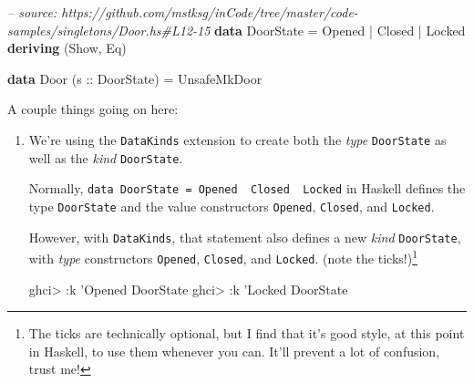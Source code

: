 \documentclass[]{article}
\newenvironment{Shaded}{}{}
\newcommand{\KeywordTok}[1]{\textcolor[rgb]{0.00,0.44,0.13}{\textbf{#1}}}
\newcommand{\DataTypeTok}[1]{\textcolor[rgb]{0.56,0.13,0.00}{#1}}
\newcommand{\CharTok}[1]{\textcolor[rgb]{0.25,0.44,0.63}{#1}}
\newcommand{\CommentTok}[1]{\textcolor[rgb]{0.38,0.63,0.69}{\textit{#1}}}
\newcommand{\OtherTok}[1]{\textcolor[rgb]{0.00,0.44,0.13}{#1}}
\newcommand{\FunctionTok}[1]{\textcolor[rgb]{0.02,0.16,0.49}{#1}}
\newcommand{\NormalTok}[1]{#1}
\begin{document}
\begin{Shaded}
\begin{Highlighting}[]
\CommentTok{-- source: https://github.com/mstksg/inCode/tree/master/code-samples/singletons/Door.hs#L12-15}
\KeywordTok{data} \DataTypeTok{DoorState} \FunctionTok{=} \DataTypeTok{Opened} \FunctionTok{|} \DataTypeTok{Closed} \FunctionTok{|} \DataTypeTok{Locked}
  \KeywordTok{deriving}\NormalTok{ (}\DataTypeTok{Show}\NormalTok{, }\DataTypeTok{Eq}\NormalTok{)}

\KeywordTok{data} \DataTypeTok{Door}\NormalTok{ (}\OtherTok{s ::} \DataTypeTok{DoorState}\NormalTok{) }\FunctionTok{=} \DataTypeTok{UnsafeMkDoor}
\end{Highlighting}
\end{Shaded}

A couple things going on here:

\begin{enumerate}
\def\labelenumi{\arabic{enumi}.}
\item
  We're using the \texttt{DataKinds} extension to create both the \emph{type}
  \texttt{DoorState} as well as the \emph{kind} \texttt{DoorState}.

  Normally,
  \texttt{data\ DoorState\ =\ Opened\ \textbar{}\ Closed\ \textbar{}\ Locked} in
  Haskell defines the type \texttt{DoorState} and the value constructors
  \texttt{Opened}, \texttt{Closed}, and \texttt{Locked}.

  However, with \texttt{DataKinds}, that statement also defines a new
  \emph{kind} \texttt{DoorState}, with \emph{type} constructors
  \texttt{\textquotesingle{}Opened}, \texttt{\textquotesingle{}Closed}, and
  \texttt{\textquotesingle{}Locked}. (note the \texttt{\textquotesingle{}}
  ticks!)\footnote{The \texttt{\textquotesingle{}} ticks are technically
    optional, but I find that it's good style, at this point in Haskell, to use
    them whenever you can. It'll prevent a lot of confusion, trust me!}

\begin{Shaded}
\begin{Highlighting}[]
\NormalTok{ghci}\FunctionTok{>} \FunctionTok{:}\NormalTok{k }\CharTok{'Opened}
\DataTypeTok{DoorState}
\NormalTok{ghci}\FunctionTok{>} \FunctionTok{:}\NormalTok{k }\CharTok{'Locked}
\DataTypeTok{DoorState}
\end{Highlighting}
\end{Shaded}
\end{enumerate}
\end{document}
